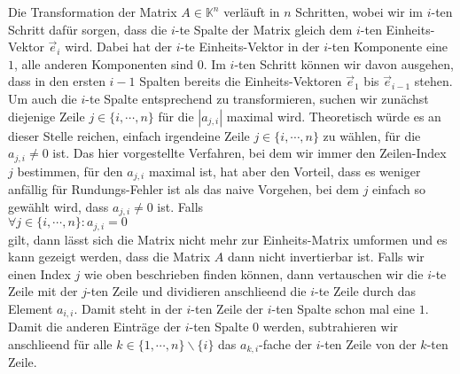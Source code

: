 Die Transformation der Matrix $A \in \mathbb{K}^n$ verl\"{a}uft in $n$ Schritten, wobei wir im $i$-ten
Schritt daf\"{u}r sorgen, dass die $i$-te Spalte der Matrix gleich dem $i$-ten Einheits-Vektor
$\vec{e}_i$ wird.  Dabei hat der $i$-te Einheits-Vektor in der $i$-ten Komponente eine $1$, alle
anderen Komponenten sind $0$.  Im $i$-ten Schritt k\"{o}nnen wir davon ausgehen, dass in den ersten $i-1$
Spalten bereits die Einheits-Vektoren $\vec{e}_1$ bis $\vec{e}_{i-1}$ stehen.
Um auch die $i$-te Spalte entsprechend zu transformieren, suchen wir zun\"{a}chst diejenige Zeile 
$j \in \{i, \cdots, n\}$ f\"{u}r die $|a_{j,i}|$ maximal wird.  Theoretisch w\"{u}rde es an dieser Stelle
reichen, einfach irgendeine Zeile $j \in \{i, \cdots, n\}$ zu w\"{a}hlen, f\"{u}r die $a_{j,i} \not= 0$ 
ist.  Das hier vorgestellte Verfahren, bei dem wir immer den Zeilen-Index $j$ bestimmen, f\"{u}r den
$a_{j,i}$ maximal ist, hat aber den Vorteil, dass es weniger anf\"{a}llig f\"{u}r Rundungs-Fehler ist als
das naive Vorgehen, bei dem $j$ einfach so gew\"{a}hlt wird, dass $a_{j,i} \not= 0$ ist.  Falls 
\\[0.2cm]
\hspace*{1.3cm}
$\forall j \in \{i, \cdots, n\} : a_{j,i} = 0$ 
\\[0.2cm]
gilt, dann l\"{a}sst sich die Matrix nicht mehr zur Einheits-Matrix umformen und es kann gezeigt werden,
dass die Matrix $A$ dann nicht invertierbar ist.  Falls wir einen Index $j$ wie oben beschrieben
finden k\"{o}nnen, dann vertauschen wir die $i$-te Zeile mit der $j$-ten Zeile und dividieren
anschlie\3end die $i$-te Zeile durch das Element $a_{i,i}$.  Damit steht in der $i$-ten Zeile der
$i$-ten Spalte schon mal eine $1$.  Damit die anderen Eintr\"{a}ge der $i$-ten Spalte $0$ werden,
subtrahieren wir anschlie\3end f\"{u}r alle $k \in \{ 1, \cdots, n \} \backslash \{i\}$ das $a_{k,i}$-fache der $i$-ten
Zeile von der $k$-ten Zeile.


